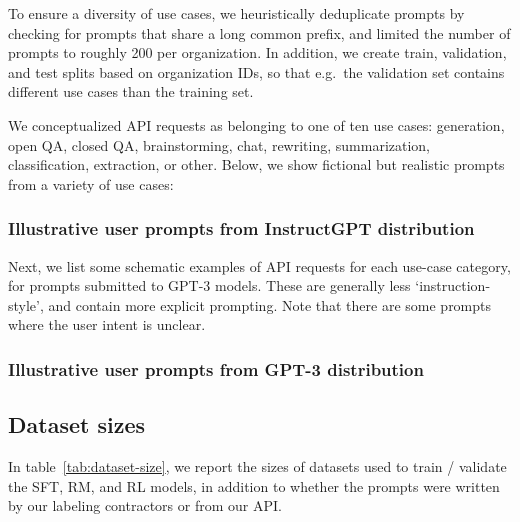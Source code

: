 \documentclass{article}
\begin{document}
To ensure a diversity of use cases, we heuristically deduplicate prompts by checking for prompts that share a long common prefix, and limited the number of prompts to roughly 200 per organization. In addition, we create train, validation, and test splits based on organization IDs, so that e.g.\ the validation set contains different use cases than the training set.

We conceptualized API requests as belonging to one of ten use cases: generation, open QA, closed QA, brainstorming, chat, rewriting, summarization, classification, extraction, or other. Below, we show fictional but realistic prompts from a variety of use cases:

\subsubsection{Illustrative user prompts from InstructGPT distribution}
\label{apdx:instructgpt-prompts}





Next, we list some schematic examples of API requests for each use-case category, for prompts submitted to GPT-3 models. These are generally less `instruction-style', and contain more explicit prompting. Note that there are some prompts where the user intent is unclear. 
\subsubsection{Illustrative user prompts from GPT-3 distribution}
\label{apdx:gpt3-prompts}





\subsection{Dataset sizes}

In table~\ref{tab:dataset-size}, we report the sizes of datasets used to train / validate the SFT, RM, and RL models, in addition to whether the prompts were written by our labeling contractors or from our API.
\end{document}
